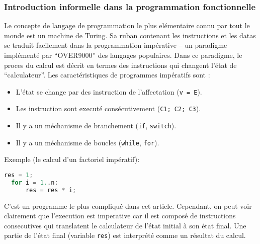 \documentclass[12pt, a4paper]{article}
\begin{document}
\subsubsection*{Introduction informelle dans la programmation fonctionnelle}
Le concepte de langage de programmation le plus elémentaire connu par tout le monde est un machine de Turing.
Sa ruban contenant les instructions et les datas se traduit facilement dans la programmation impérative -- un paradigme implémenté par ``OVER9000'' des langages populaires.
Dans ce paradigme, le proces du calcul est décrit en termes des instructions qui changent l'état de ``calculateur''.
Les caractéristiques de programmes impératifs sont :
\begin{itemize}
	\item L'état se change par des instruction de l'affectation (\verb|v = E|).
	\item Les instruction sont executé consécutivement (\verb|C1; C2; C3|).
	\item Il y a un méchanisme de branchement (\verb|if|, \verb|switch|).
	\item Il y a un méchanisme de boucles (\verb|while|, \verb|for|).
\end{itemize}
Exemple (le calcul d'un factoriel impératif):
\begin{lstlisting}[language=Python]
  res = 1;
  for i = 1..n:
      res = res * i;
\end{lstlisting}
C'est un programme le plus compliqué dans cet article.
Cependant, on peut voir clairement que l'execution est imperative car il est composé de instructions consecutives qui translatent le calculateur de l'état initial à son état final.
Une partie de l'état final (variable \verb|res|) est interprété comme un résultat du calcul.
\end{document}
